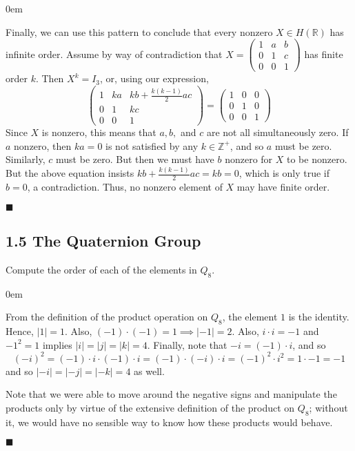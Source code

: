 \documentclass[12pt]{article}
\renewcommand{\qed}{\hfill$\blacksquare$}
\renewenvironment{proof}{\begin{addmargin}[1em]{0em}\begin{newproof}}{\end{newproof}\end{addmargin}\qed}
\newenvironment{problem}[2][Exercise]{\begin{trivlist}
\item[\hskip \labelsep {\bfseries #1}\hskip \labelsep {\bfseries #2.}]}{\end{trivlist}}
\begin{document}
\begin{proof}
Finally, we can use this pattern to conclude that every nonzero $X\in H\left(\mathbb{R}\right)$ has infinite order. Assume by way of contradiction that $X=\left(\begin{array}{ccc} 1 & a & b \\ 0 & 1 & c \\ 0 & 0 & 1 \end{array}\right)$ has finite order $k$. Then $X^k = I_3$, or, using our expression,
$$ \left(\begin{array}{ccc} 1 & ka & kb+\frac{k\left(k-1\right)}{2}ac \\ 0 & 1 & kc \\ 0 & 0 & 1 \end{array}\right) = \left(\begin{array}{ccc} 1 & 0 & 0 \\ 0 & 1 & 0 \\ 0 & 0 & 1 \end{array}\right) $$ Since $X$ is nonzero, this means that $a,b,$ and $c$ are not all simultaneously zero. If $a$ nonzero, then $ka=0$ is not satisfied by any $k\in \mathbb{Z}^+$, and so $a$ must be zero. Similarly, $c$ must be zero. But then we must have $b$ nonzero for $X$ to be nonzero. But the above equation insists $kb+\frac{k\left(k-1\right)}{2}ac = kb = 0$, which is only true if $b=0$, a contradiction. Thus, no nonzero element of $X$ may have finite order.
\end{proof}











\subsection*{1.5 The Quaternion Group}

\begin{problem}{1.5.1}
Compute the order of each of the elements in $Q_8$.
\end{problem}

\begin{proof}
From the definition of the product operation on $Q_8$, the element $1$ is the identity. Hence, $\left|1\right|=1$. Also, $\left(-1\right)\cdot \left(-1\right)=1 \implies \left|-1\right| = 2$. Also, $i\cdot i = -1$ and $-1^2 = 1$ implies $\left|i\right|=\left|j\right|=\left|k\right|=4$. Finally, note that $-i=\left(-1\right)\cdot i$, and so $$\left(-i\right)^2 = \left(-1\right)\cdot i \cdot \left(-1\right)\cdot i = \left(-1\right)\cdot \left(-i\right) \cdot i = \left(-1\right)^2\cdot i^2 = 1\cdot -1 = -1 $$ and so $\left|-i\right|=\left|-j\right|=\left|-k\right|=4$ as well.

Note that we were able to move around the negative signs and manipulate the products only by virtue of the extensive definition of the product on $Q_8$; without it, we would have no sensible way to know how these products would behave.
\end{proof}
\end{document}
